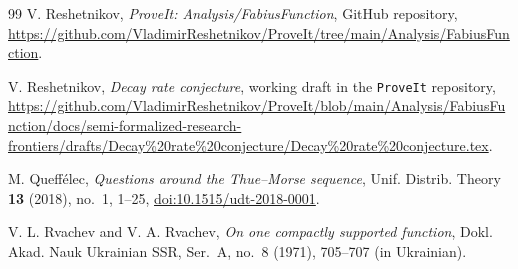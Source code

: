 \documentclass[11pt,oneside]{article}
\theoremstyle{definition}
\theoremstyle{remark}
\begin{document}
\begin{thebibliography}{99}
V. Reshetnikov,
\emph{ProveIt: Analysis/FabiusFunction}, GitHub repository,
\url{https://github.com/VladimirReshetnikov/ProveIt/tree/main/Analysis/FabiusFunction}.

V. Reshetnikov,
\emph{Decay rate conjecture}, working draft in the \texttt{ProveIt} repository,
\url{https://github.com/VladimirReshetnikov/ProveIt/blob/main/Analysis/FabiusFunction/docs/semi-formalized-research-frontiers/drafts/Decay%20rate%20conjecture/Decay%20rate%20conjecture.tex}.

M. Queff\'elec,
\emph{Questions around the Thue--Morse sequence},
Unif. Distrib. Theory \textbf{13} (2018), no.~1, 1--25,
\href{https://doi.org/10.1515/udt-2018-0001}{doi:10.1515/udt-2018-0001}.

V. L. Rvachev and V. A. Rvachev,
\emph{On one compactly supported function},
Dokl. Akad. Nauk Ukrainian SSR, Ser.~A, no.~8 (1971), 705--707
(in Ukrainian).

\end{thebibliography}
\end{document}
